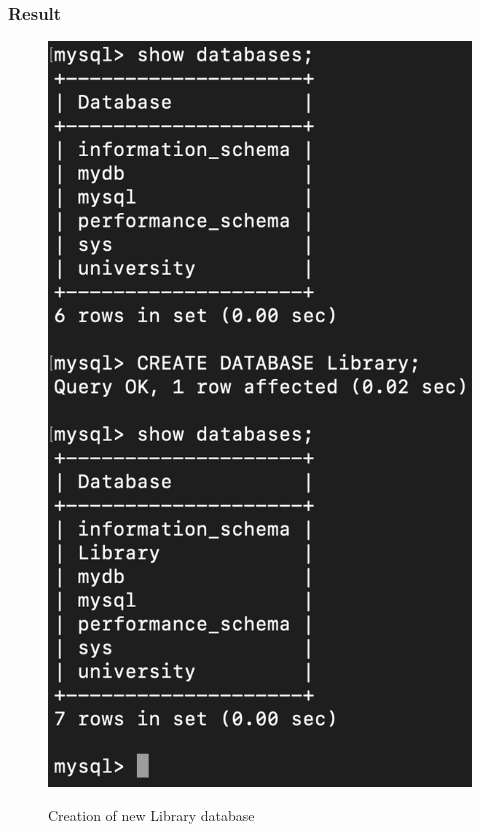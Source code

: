 \documentclass[12pt]{article}
\begin{document}
\subsubsection*{Result}
\begin{figure}[!hbt]
    \centering
    \includegraphics[scale=0.7]{screenshots/b1_01.png}
    \label{fig:my_label1}
    \caption{Creation of new Library database}
\end{figure}

\newpage
\end{document}
